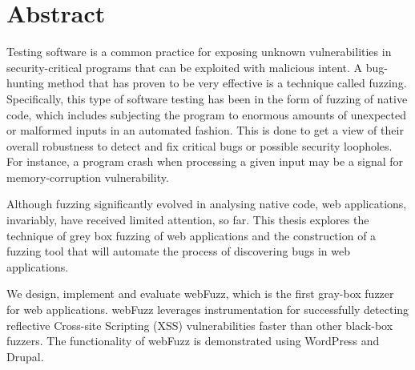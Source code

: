 \section*{\LARGE{Abstract}}

Testing software is a common practice for exposing unknown vulnerabilities
in security-critical programs that can be exploited with malicious intent.
A bug-hunting method that has proven to be very effective is a technique
called fuzzing. Specifically, this type of software testing has been in the
form of fuzzing of native code, which includes subjecting the program to
enormous amounts of unexpected or malformed inputs in an automated fashion.
This is done to get a view of their overall robustness to detect and fix
critical bugs or possible security loopholes. For instance, a program crash
when processing a given input may be a signal for memory-corruption
vulnerability.

Although fuzzing significantly evolved in analysing native code, web
applications, invariably, have received limited attention, so far. This thesis
explores the technique of grey box fuzzing of web applications and the
construction of a fuzzing tool that will automate the process of discovering
bugs in web applications.

We design, implement and evaluate webFuzz, which is the first gray-box
fuzzer for web applications. webFuzz leverages instrumentation for successfully
detecting reflective Cross-site Scripting (XSS) vulnerabilities faster than other
black-box fuzzers. The functionality of webFuzz is demonstrated using WordPress
and Drupal.